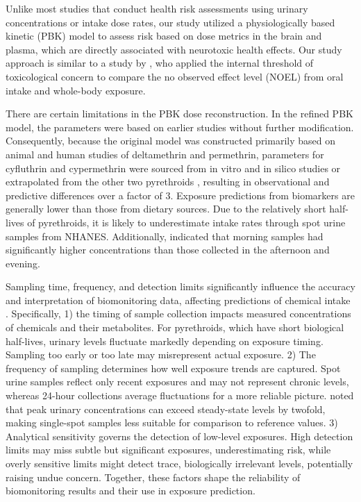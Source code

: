 \documentclass[toxics,article,submit,pdftex,moreauthors]{Definitions/mdpi}
\begin{document}
Unlike most studies that conduct health risk assessments using urinary
concentrations or intake dose rates, our study utilized a
physiologically based kinetic (PBK) model to assess risk based on dose
metrics in the brain and plasma, which are directly associated with
neurotoxic health effects. Our study approach is similar to a study by
\citet{arnot_developing_2022}, who applied the internal threshold of
toxicological concern to compare the no observed effect level (NOEL)
from oral intake and whole-body exposure.

There are certain limitations in the PBK dose reconstruction. In the
refined PBK model, the parameters were based on earlier studies without
further modification. Consequently, because the original model was
constructed primarily based on animal and human studies of deltamethrin
and permethrin, parameters for cyfluthrin and cypermethrin were sourced
from in vitro and in silico studies or extrapolated from the other two
pyrethroids \citep{quindroit2019estimating}, resulting in observational
and predictive differences over a factor of 3. Exposure predictions from
biomarkers are generally lower than those from dietary sources. Due to
the relatively short half-lives of pyrethroids, it is likely to
underestimate intake rates through spot urine samples from NHANES.
Additionally, \citet{barr2010urinary} indicated that morning samples had
significantly higher concentrations than those collected in the
afternoon and evening. 

Sampling time, frequency, and detection limits significantly influence the
accuracy and interpretation of biomonitoring data, affecting predictions of
chemical intake \citep{hays2007biomonitoring}. Specifically, 1) the timing of
sample collection impacts measured concentrations of chemicals and their
metabolites. For pyrethroids, which have short biological half-lives, urinary
levels fluctuate markedly depending on exposure timing. Sampling too early or
too late may misrepresent actual exposure. 2) The frequency of sampling
determines how well exposure trends are captured. Spot urine samples reflect
only recent exposures and may not represent chronic levels, whereas 24-hour
collections average fluctuations for a more reliable picture.
\citet{hays2007biomonitoring} noted that peak urinary concentrations can exceed
steady-state levels by twofold, making single-spot samples less suitable for
comparison to reference values. 3) Analytical sensitivity governs the detection
of low-level exposures. High detection limits may miss subtle but significant
exposures, underestimating risk, while overly sensitive limits might detect
trace, biologically irrelevant levels, potentially raising undue concern.
Together, these factors shape the reliability of biomonitoring results and
their use in exposure prediction.
\end{document}
